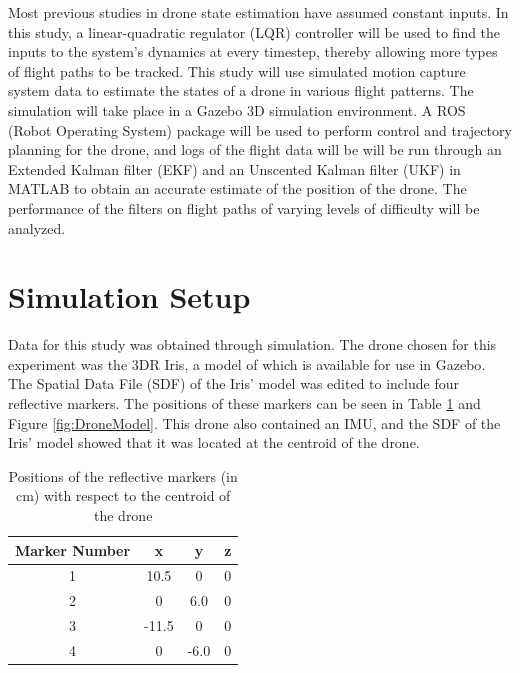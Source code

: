 \documentclass[letterpaper, preprint, paper,11pt]{AAS}	%
\begin{document}
Most previous studies in drone state estimation have assumed constant inputs. In this study, a linear-quadratic regulator (LQR) controller will be used to find the inputs to the system's dynamics at every timestep, thereby allowing more types of flight paths to be tracked. This study will use simulated motion capture system data to estimate the states of a drone in various flight patterns. The simulation will take place in a Gazebo 3D simulation environment\cite{gazebo}. A ROS (Robot Operating System)\cite{ros} package will be used to perform control and trajectory planning for the drone, and logs of the flight data will be will be run through an Extended Kalman filter (EKF) and an Unscented Kalman filter (UKF) in MATLAB to obtain an accurate estimate of the position of the drone. The performance of the filters on flight paths of varying levels of difficulty will be analyzed.


\section{Simulation Setup}

Data for this study was obtained through simulation. The drone chosen for this experiment was the 3DR Iris\cite{iris}, a model of which is available for use in Gazebo\cite{gazebo}. The Spatial Data File (SDF) of the Iris' model was edited to include four reflective markers. The positions of these markers can be seen in Table \ref{tab:DroneModel} and Figure \ref{fig:DroneModel}. This drone also contained an IMU, and the SDF of the Iris' model showed that it was located at the centroid of the drone.

\begin{table}[htbp]
	\fontsize{10}{10}\selectfont
    \caption{Positions of the reflective markers (in cm) with respect to the centroid of the drone}
   \label{tab:DroneModel}
        \centering 
   \begin{tabular}{c | c | c | c} %
      \hline 
      Marker Number    & x & y & z \\
      \hline 
      1      & 10.5 & 0 & 0 \\
      2      & 0 & 6.0 & 0 \\
      3      & -11.5 & 0 & 0 \\
      4      & 0 & -6.0 & 0 \\
      \hline
   \end{tabular}
\end{table}
\end{document}
